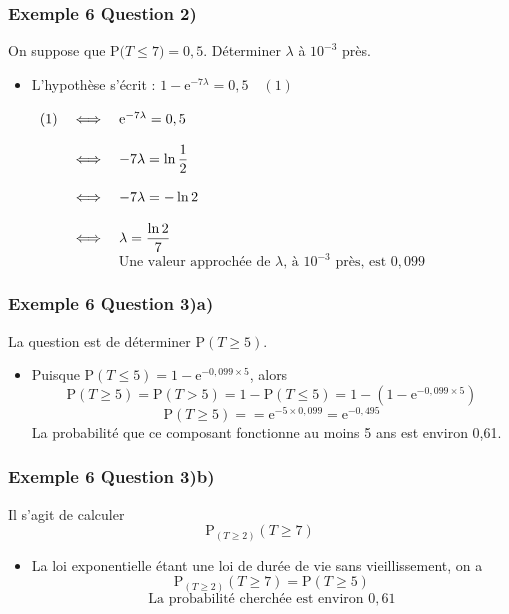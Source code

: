 \documentclass[xcolor=svgnames,t,final]{beamer}
\newcommand{\proba}[1]{\text{P}\big(#1\big)}
\begin{document}
\begin{frame}


\frametitle{Exemple 6 Question 2)}
On suppose que $\proba{T \leqslant 7}=0,5$. Déterminer $\lambda$ à $10^{-3}$ près.

\begin{itemize}
\pause \item L'hypothèse s'écrit : $1-\text{e}^{-7\lambda}=0,5\quad (1)$

$\begin{array}[t]{lcl}
(1)&\iff&\text{e}^{-7\lambda}=0,5\\
&&\\
&\iff&-7\lambda=\ln \dfrac{1}{2} \\
&&\\
&\iff&-7\lambda=-\ln 2 \\
&&\\
&\iff&\lambda=\dfrac{\ln 2}{7}
\end{array}$
\[\text{Une valeur approchée de }\lambda\text{, à  }10^{-3}\text{ près, est } 0,099\]

\end{itemize}


\end{frame}


\begin{frame}


\frametitle{Exemple 6 Question 3)a)}

La question est de déterminer P$(T\geqslant 5)$.


\begin{itemize}
\pause \item 
Puisque P$(T\leqslant 5)=1-\text{e}^{-0,099\times 5}$, alors 
\[\text{P} (T\geqslant 5)=\text{P}(T>5)=1-\text{P}(T\leqslant 5)=1-(1-\text{e}^{-0,099\times 5})\]
\[\text{P} (T\geqslant 5)==\text{e}^{-5\times 0,099}=\text{e}^{-0,495}\]		
La probabilité que ce composant fonctionne au moins 5 ans est environ  0,61.


\end{itemize}


\end{frame}





\begin{frame}


\frametitle{Exemple 6 Question 3)b)}

Il s'agit de calculer 
\[\text{P}_{(T\geqslant 2)}(T\geqslant 7)\]	


\begin{itemize}

	\pause	\item
	
La loi exponentielle étant une loi de durée de vie sans vieillissement, on a 
\[\text{P}_{(T\geqslant 2)}(T\geqslant 7)=\text{P}(T\geqslant 5)\]	\[\text{La probabilité cherchée est environ } 0,61\]


\end{itemize}


\end{frame}
\end{document}

